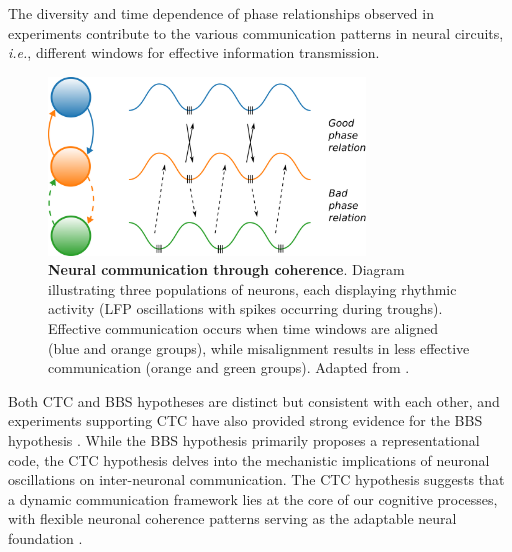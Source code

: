 \documentclass[../main.tex]{subfiles}
\begin{document}
The diversity and time dependence of phase relationships observed in experiments \citep{womelsdorf2006neuronal,tiesinga2010mechanisms,van2015both,maris_diverse_2016} contribute to the various communication patterns in neural circuits, \textit{i.e.}, different windows for effective information transmission.
\begin{figure}
    \centering
    \includegraphics[width=0.75\textwidth]{chapter2/figures/coherence.png}
    \caption{\textbf{Neural communication through coherence}.
    Diagram illustrating three populations of neurons, each displaying rhythmic activity (LFP oscillations with spikes occurring during troughs).
    Effective communication occurs when time windows are aligned (blue and orange groups), while misalignment results in less effective communication (orange and green groups).
    Adapted from \citep{fries_mechanism_2005}.}
    \label{fig:CTC}
\end{figure}

Both CTC and BBS hypotheses are distinct but consistent with each other, and experiments supporting CTC have also provided strong evidence for the BBS hypothesis \citep{bosman2012attentional}.
While the BBS hypothesis primarily proposes a representational code, the CTC hypothesis delves into the mechanistic implications of neuronal oscillations on inter-neuronal communication.
The CTC hypothesis suggests that a dynamic communication framework lies at the core of our cognitive processes, with flexible neuronal coherence patterns serving as the adaptable neural foundation \citep{sancristobal_role_2014,fries_mechanism_2005,fries_rhythms_2015}.
\clearpage
\end{document}
